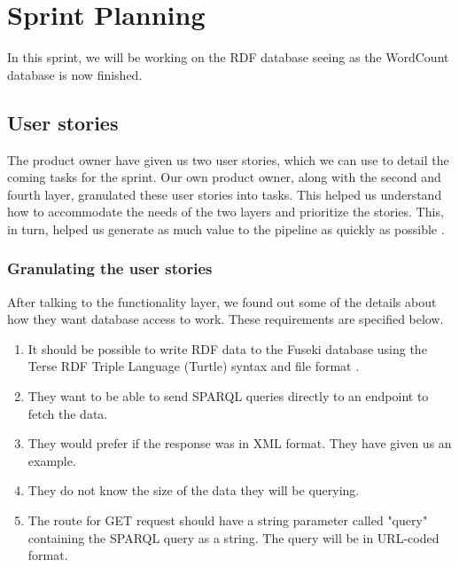 \section{Sprint Planning}
In this sprint, we will be working on the RDF database seeing as the WordCount database is now finished.

\subsection*{User stories}\label{sec:userstories5}
The \knox{} product owner have given us two user stories, which we can use to detail the coming tasks for the sprint.
Our own product owner, along with the second and fourth layer, granulated these user stories into tasks.
This helped us understand how to accommodate the needs of the two layers and prioritize the stories.
This, in turn, helped us generate as much value to the pipeline as quickly as possible \cite{UserStories}.


\subsubsection*{Granulating the user stories}
After talking to the functionality layer, we found out some of the details about how they want database access to work. These requirements are specified below.

\begin{enumerate}
    \item It should be possible to write RDF data to the Fuseki database using the Terse RDF Triple Language (Turtle) syntax and file format \cite{TurtleFormat}.
    \item They want to be able to send SPARQL queries directly to an endpoint to fetch the data.
    \item They would prefer if the response was in XML format. They have given us an example.
    \item They do not know the size of the data they will be querying.
    \item The route for GET request should have a string parameter called "query" containing the SPARQL query as a string.
    The query will be in URL-coded format.
\end{enumerate}

